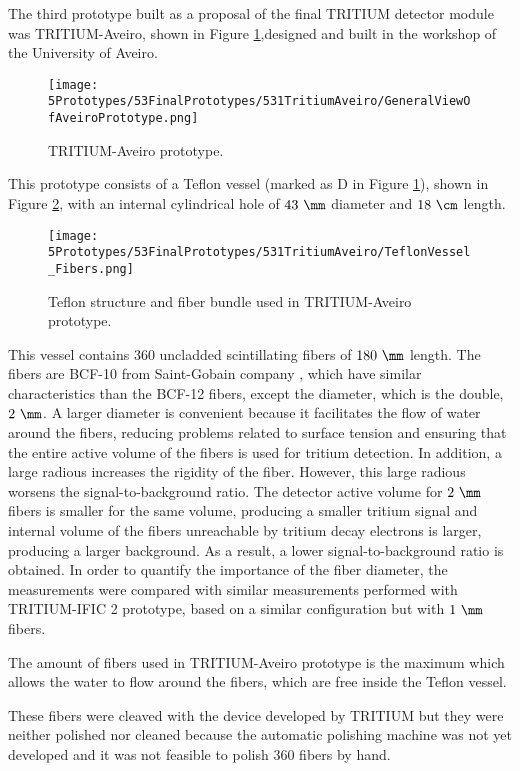The third prototype built as a proposal of the final TRITIUM detector module was TRITIUM-Aveiro, shown in Figure \ref{fig:TritiumAveiro0},designed and built in the workshop of the University of Aveiro. 

\begin{figure}[h]
\centering
\texttt{[image: 5Prototypes/53FinalPrototypes/531TritiumAveiro/GeneralViewOfAveiroPrototype.png]}
\caption{TRITIUM-Aveiro prototype.\label{fig:TritiumAveiro0}}
\end{figure}
This prototype consists of a Teflon vessel (marked as D in Figure \ref{fig:TritiumAveiro0}), shown in Figure \ref{fig:TeflonStructureFibersTritiumAveiro0}, with an internal cylindrical hole of $43~\mm$ diameter and $18~\cm$ length. 

\begin{figure}[h]
\centering
\texttt{[image: 5Prototypes/53FinalPrototypes/531TritiumAveiro/TeflonVessel\_Fibers.png]}
\caption{Teflon structure and fiber bundle used in TRITIUM-Aveiro prototype.\label{fig:TeflonStructureFibersTritiumAveiro0}}
\end{figure}
This vessel contains $360$ uncladded scintillating fibers of $180~\mm$ length. The fibers are BCF-10 from Saint-Gobain company \cite{DataSheetBCF10Fiber}, which have similar characteristics than the BCF-12 fibers, except the diameter, which is the double, $2~\mm$. A larger diameter is convenient because it facilitates the flow of water around the fibers, reducing problems related to surface tension and ensuring that the entire active volume of the fibers is used for tritium detection. In addition, a large radious increases the rigidity of the fiber. However, this large radious worsens the signal-to-background ratio. The detector active volume for $2~\mm$ fibers is smaller for the same volume, producing a smaller tritium signal and internal volume of the fibers unreachable by tritium decay electrons is larger, producing a larger background. As a result, a lower signal-to-background ratio is obtained. In order to quantify the importance of the fiber diameter, the measurements were compared with similar measurements performed with TRITIUM-IFIC 2 prototype, based on a similar configuration but with $1~\mm$ fibers.

The amount of fibers used in TRITIUM-Aveiro prototype is the maximum which allows the water to flow around the fibers, which are free inside the Teflon vessel. 

These fibers were cleaved with the device developed by TRITIUM but they were neither polished nor cleaned because the automatic polishing machine was not yet developed and it was not feasible to polish 360 fibers by hand. 

